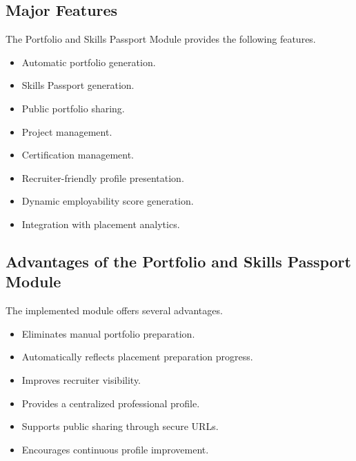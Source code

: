\subsection{Major Features}

The Portfolio and Skills Passport Module provides the following features.

\begin{itemize}

\item Automatic portfolio generation.

\item Skills Passport generation.

\item Public portfolio sharing.

\item Project management.

\item Certification management.

\item Recruiter-friendly profile presentation.

\item Dynamic employability score generation.

\item Integration with placement analytics.

\end{itemize}

\subsection{Advantages of the Portfolio and Skills Passport Module}

The implemented module offers several advantages.

\begin{itemize}

\item Eliminates manual portfolio preparation.

\item Automatically reflects placement preparation progress.

\item Improves recruiter visibility.

\item Provides a centralized professional profile.

\item Supports public sharing through secure URLs.

\item Encourages continuous profile improvement.

\end{itemize}

